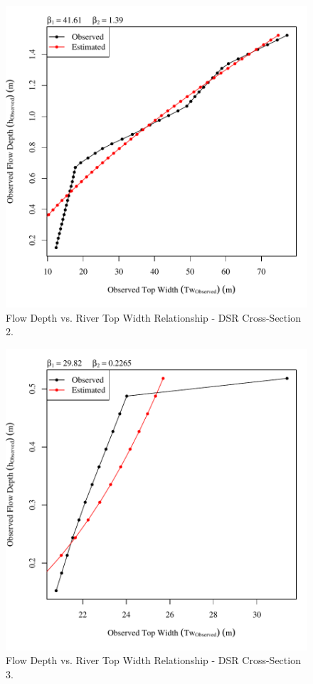 \begin{center}
\begin{figure}[htbp]
	\includegraphics[width=6in]{"Figures/Results_DSR/Survey Tw vs H-Section 2"}
	\caption{Flow Depth vs. River Top Width Relationship - DSR Cross-Section 2.}
\end{figure}
\end{center}
\newpage

\begin{center}
\begin{figure}[htbp]
	\includegraphics[width=6in]{"Figures/Results_DSR/Survey Tw vs H-Section 3"}
	\caption{Flow Depth vs. River Top Width Relationship - DSR Cross-Section 3.}
\end{figure}
\end{center}
\newpage

